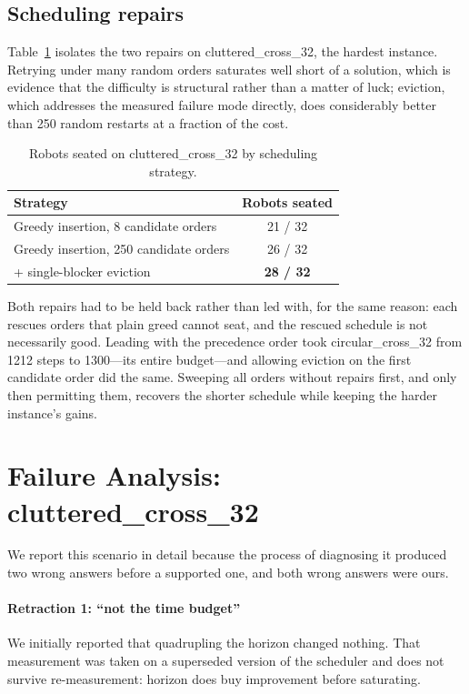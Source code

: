 \documentclass[conference]{IEEEtran}
\begin{document}
\subsection{Scheduling repairs}
\label{sec:res-sched}

Table~\ref{tab:sched} isolates the two repairs on cluttered\_cross\_32, the hardest
instance. Retrying under many random orders saturates well short of a solution, which is
evidence that the difficulty is structural rather than a matter of luck; eviction, which
addresses the measured failure mode directly, does considerably better than 250 random
restarts at a fraction of the cost.

\begin{table}[t]
\caption{Robots seated on cluttered\_cross\_32 by scheduling strategy.}
\label{tab:sched}
\centering
\small
\begin{tabular}{@{}lc@{}}
\toprule
Strategy & Robots seated \\
\midrule
Greedy insertion, 8 candidate orders   & 21 / 32 \\
Greedy insertion, 250 candidate orders & 26 / 32 \\
+ single-blocker eviction              & \textbf{28 / 32} \\
\bottomrule
\end{tabular}
\end{table}

Both repairs had to be held back rather than led with, for the same reason: each rescues
orders that plain greed cannot seat, and the rescued schedule is not necessarily good.
Leading with the precedence order took circular\_cross\_32 from 1212 steps to 1300---its
entire budget---and allowing eviction on the first candidate order did the same. Sweeping
all orders without repairs first, and only then permitting them, recovers the shorter
schedule while keeping the harder instance's gains.

\section{Failure Analysis: cluttered\_cross\_32}
\label{sec:failure}

We report this scenario in detail because the process of diagnosing it produced two wrong
answers before a supported one, and both wrong answers were ours.

\paragraph{Retraction 1: ``not the time budget''} We initially reported that quadrupling
the horizon changed nothing. That measurement was taken on a superseded version of the
scheduler and does not survive re-measurement: horizon does buy improvement before
saturating.
\end{document}
